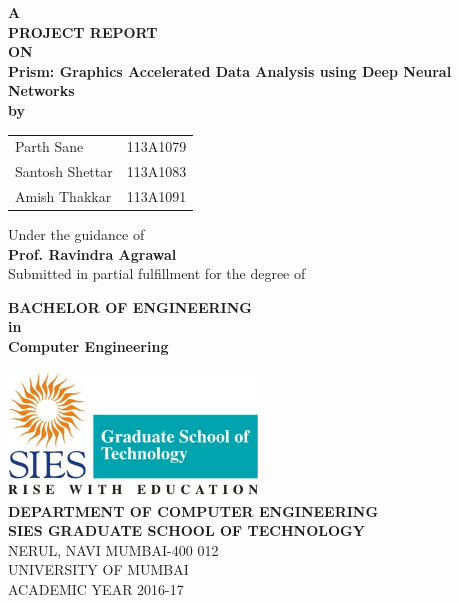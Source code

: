 

\begin{titlepage}
\begin{center}
\textup{\small {\bf A } \\
	 \textbf{PROJECT REPORT}}\\
 \small\textbf{ON}\\[0.3in]

\Large \textbf {Prism: Graphics Accelerated Data Analysis using Deep Neural Networks}\\[0.2in]
\small \textbf{by}\\

\begin{table}[h]
	\centering
	\begin{tabular}{lr} 
		Parth Sane &  113A1079 \\
		Santosh Shettar &  113A1083 \\
		Amish Thakkar &  113A1091 \\    
	\end{tabular}
\end{table}

\vspace{.1in}
Under the guidance of\\
{\textbf{Prof. Ravindra Agrawal}}\\[0.2in]

       Submitted in partial fulfillment for the degree of
        \vspace{.2in}

       {\bf BACHELOR OF ENGINEERING \\in\\ Computer Engineering}\\[0.5in]

\vfill

\includegraphics[width=0.5\textwidth]{SIES_GST}\\[0.3in]

\textbf{DEPARTMENT OF COMPUTER ENGINEERING}\\
\normalsize
\textbf{SIES GRADUATE SCHOOL OF TECHNOLOGY}\\
\vspace{0.2cm}
NERUL, NAVI MUMBAI-400 012\\

UNIVERSITY OF MUMBAI\\
ACADEMIC YEAR 2016-17

\end{center}

\end{titlepage}

